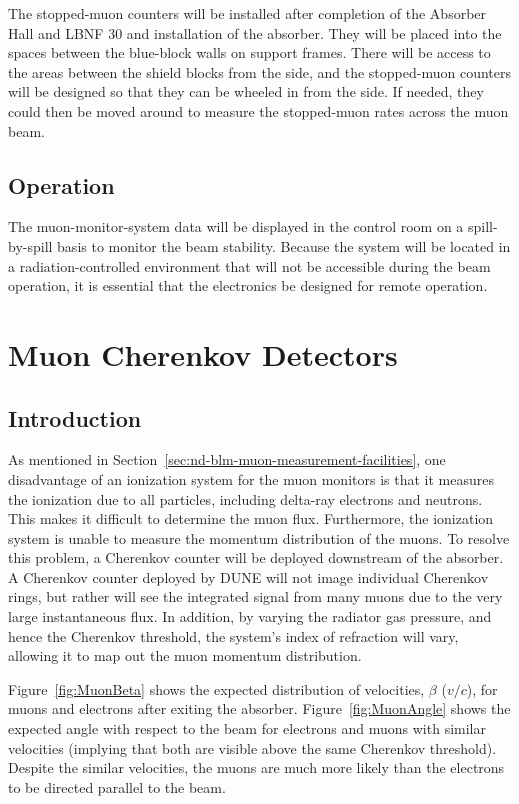The stopped-muon counters will be installed after completion of the 
Absorber Hall and LBNF 30  
and installation of the absorber. 
They will be placed into the spaces between the blue-block walls on
support frames.   There will be access to the areas between the shield blocks 
from the side, and the stopped-muon counters will be designed so that they can 
be wheeled in from the side.  If needed, they could then be moved around to measure
the stopped-muon rates across the muon beam.

\subsection{Operation}

The muon-monitor-system data will be displayed in the control room on
a spill-by-spill basis to monitor the beam stability. Because the
system will be located in a radiation-controlled environment that will
not be accessible during the beam operation, it is essential that the
electronics be designed for remote operation.

%
%
\section{Muon Cherenkov Detectors} %
\label{sec:nd-blm-muon-cherenkov}

\subsection{Introduction}

As mentioned in Section~\ref{sec:nd-blm-muon-measurement-facilities}, one disadvantage of an ionization system for the
muon monitors is that it measures the ionization due to all
particles, including delta-ray electrons and neutrons. This makes it
difficult to determine the muon flux.  Furthermore, the ionization
system is unable to measure the momentum distribution of the
muons. To resolve this problem, a Cherenkov
counter will be deployed downstream of the absorber.  A Cherenkov counter deployed by DUNE
will not image individual Cherenkov rings, but rather will see the
integrated signal from many muons due to the very large instantaneous flux. 
In addition, by varying the radiator gas pressure, and hence the Cherenkov threshold, the system's index of refraction will vary, allowing it to map out the muon momentum distribution.


Figure~\ref{fig:MuonBeta} shows the expected distribution of
velocities, $\beta$ ($v/c$), for muons and electrons after exiting the
absorber. 
Figure~\ref{fig:MuonAngle} shows the expected angle with respect to the beam for
electrons and muons with similar velocities (implying that both are visible above the 
same Cherenkov threshold).  Despite the similar velocities, the muons are much more likely
than the electrons to be directed parallel to the beam.

